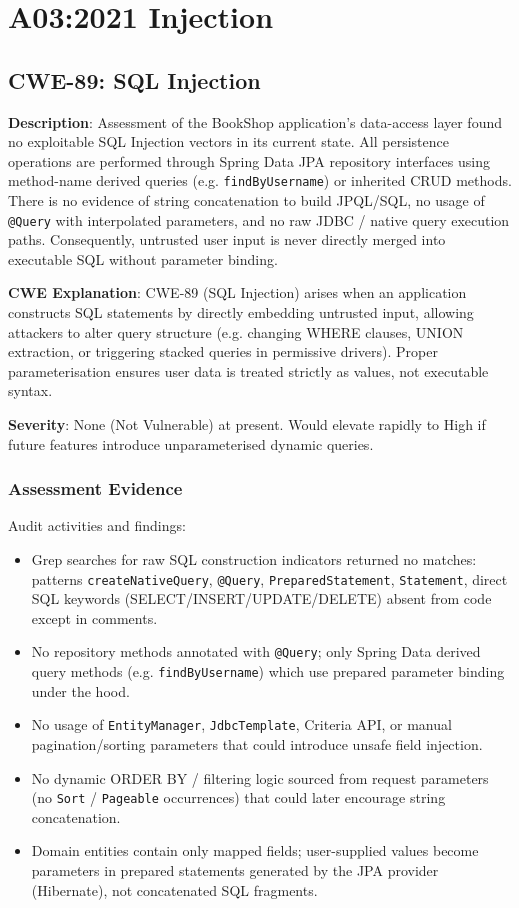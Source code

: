 \documentclass[]{UCD_CS_FYP_Report}
\begin{document}
\chapter{A03:2021 Injection}


\section{CWE-89: SQL Injection}

	\textbf{Description}: Assessment of the BookShop application's data-access layer found no exploitable SQL Injection vectors in its current state. All persistence operations are performed through Spring Data JPA repository interfaces using method-name derived queries (e.g. \texttt{findByUsername}) or inherited CRUD methods. There is no evidence of string concatenation to build JPQL/SQL, no usage of \texttt{@Query} with interpolated parameters, and no raw JDBC / native query execution paths. Consequently, untrusted user input is never directly merged into executable SQL without parameter binding.

	\textbf{CWE Explanation}: CWE-89 (SQL Injection) arises when an application constructs SQL statements by directly embedding untrusted input, allowing attackers to alter query structure (e.g. changing WHERE clauses, UNION extraction, or triggering stacked queries in permissive drivers). Proper parameterisation ensures user data is treated strictly as values, not executable syntax.

	\textbf{Severity}: None (Not Vulnerable) at present. Would elevate rapidly to High if future features introduce unparameterised dynamic queries.


\subsection*{Assessment Evidence}
Audit activities and findings:
\begin{itemize}
 \item Grep searches for raw SQL construction indicators returned no matches: patterns \texttt{createNativeQuery}, \texttt{@Query}, \texttt{PreparedStatement}, \texttt{Statement}, direct SQL keywords (SELECT/INSERT/UPDATE/DELETE) absent from code except in comments.
 \item No repository methods annotated with \texttt{@Query}; only Spring Data derived query methods (e.g. \texttt{findByUsername}) which use prepared parameter binding under the hood.
 \item No usage of \texttt{EntityManager}, \texttt{JdbcTemplate}, Criteria API, or manual pagination/sorting parameters that could introduce unsafe field injection.
 \item No dynamic ORDER BY / filtering logic sourced from request parameters (no \texttt{Sort} / \texttt{Pageable} occurrences) that could later encourage string concatenation.
 \item Domain entities contain only mapped fields; user-supplied values become parameters in prepared statements generated by the JPA provider (Hibernate), not concatenated SQL fragments.
\end{itemize}
\end{document}
